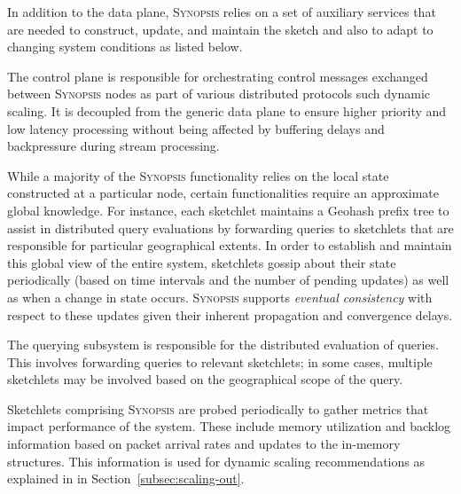 In addition to the data plane, \textsc{Synopsis} relies on a set of auxiliary services that are needed to construct, update, and maintain the sketch and also to adapt to changing system conditions as listed below.
\begin{description}[leftmargin=*]
	\item[Control plane:] The control plane is responsible for orchestrating control messages exchanged between \textsc{Synopsis} nodes as part of various distributed protocols such dynamic scaling.
    It is decoupled from the generic data plane to ensure higher priority and low latency processing without being affected by buffering delays and backpressure during stream processing.

	\item[Gossip subsystem:] While a majority of the \textsc{Synopsis} functionality relies on the local state constructed at a particular node, certain functionalities require an approximate global knowledge.
    For instance, each sketchlet maintains a Geohash prefix tree to assist in distributed query evaluations by forwarding queries to sketchlets that are responsible for particular geographical extents.
        In order to establish and maintain this global view of the entire system, sketchlets gossip about their state periodically (based on time intervals and the number of pending updates) as well as when a change in state occurs.
    \textsc{Synopsis} supports \emph{eventual consistency} with respect to these updates given their inherent propagation and convergence delays.

	\item[Querying subsystem:] The querying subsystem is responsible for the distributed evaluation of queries.
    This involves forwarding queries to relevant sketchlets; in some cases, multiple sketchlets may be involved based on the geographical scope of the query.

    \item[Monitoring subsystem:] Sketchlets comprising \textsc{Synopsis} are probed periodically to gather metrics that impact performance of the system.
    These include memory utilization and backlog information based on packet arrival rates and updates to the in-memory structures.
    This information is used for dynamic scaling recommendations as explained in in Section~\ref{subsec:scaling-out}.
\end{description}
